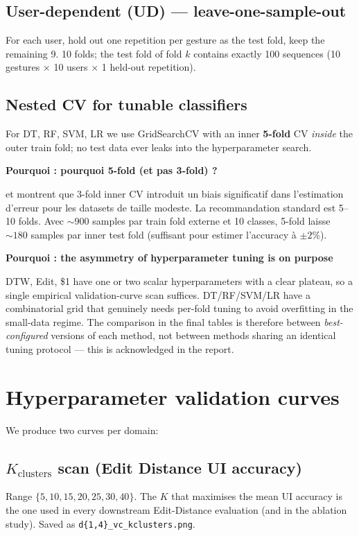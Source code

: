 \documentclass[11pt,a4paper]{article}
\newenvironment{whybox}[1]{%
    \begin{shaded*}\noindent\textbf{Pourquoi : #1}\par\vspace{0.3em}}
    {\end{shaded*}}
\renewenvironment{shaded*}
    {\definecolor{shadecolor}{named}{whyboxbg}\begin{shaded}}
    {\end{shaded}}
\begin{document}
\subsection{User-dependent (UD) --- leave-one-sample-out}
For each user, hold out one repetition per gesture as the test fold,
keep the remaining 9. 10 folds; the test fold of fold $k$ contains
exactly 100 sequences (10 gestures $\times$ 10 users $\times$ 1
held-out repetition).

\subsection{Nested CV for tunable classifiers}\label{sec:innercv}
For DT, RF, SVM, LR we use GridSearchCV with an inner \textbf{5-fold}
CV \emph{inside} the outer train fold; no test data ever leaks into the
hyperparameter search.

\begin{whybox}{pourquoi 5-fold (et pas 3-fold) ?}
\cite{varma2006bias} et \cite{cawley2010overfitting} montrent que
3-fold inner CV introduit un biais significatif dans l'estimation
d'erreur pour les datasets de taille modeste. La recommandation
standard est 5--10 folds. Avec $\sim 900$ samples par train fold
externe et 10 classes, 5-fold laisse $\sim 180$ samples par inner
test fold (suffisant pour estimer l'accuracy à $\pm 2\%$).
\end{whybox}

\begin{whybox}{the asymmetry of hyperparameter tuning is on purpose}
DTW, Edit, \$1 have one or two scalar hyperparameters with a clear
plateau, so a single empirical validation-curve scan suffices.
DT/RF/SVM/LR have a combinatorial grid that genuinely needs per-fold
tuning to avoid overfitting in the small-data regime. The comparison
in the final tables is therefore between \emph{best-configured}
versions of each method, not between methods sharing an identical
tuning protocol --- this is acknowledged in the report.
\end{whybox}

\section{Hyperparameter validation curves}\label{sec:vc}

We produce two curves per domain:

\subsection{$K_{\text{clusters}}$ scan (Edit Distance UI accuracy)}
Range $\{5,10,15,20,25,30,40\}$. The $K$ that maximises the mean UI
accuracy is the one used in every downstream Edit-Distance evaluation
(and in the ablation study). Saved as
\texttt{d\{1,4\}\_vc\_kclusters.png}.
\end{document}

